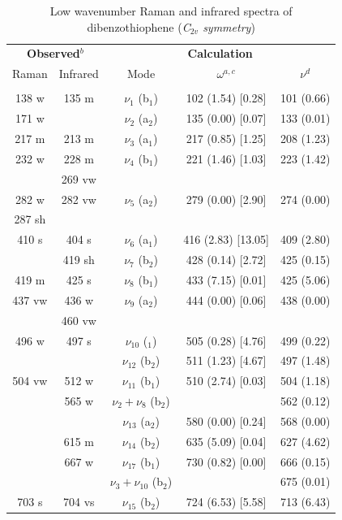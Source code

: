 	\begin{table}[H]
		\begin{center}
			\caption[Low wavenumber Raman and infrared spectra of dibenzothiophene]{Low wavenumber Raman and infrared spectra of dibenzothiophene (\textit{C$_{2v}$ symmetry})}
			\begin{threeparttable}[b]
				\begin{tabular}{c c c c c}
					\toprule
					\multicolumn{2}{p{5cm}}{\centering \textbf{Observed$^{b}$}} & \multicolumn{3}{p{10cm}}{\centering \textbf{Calculation}} \\
					Raman & Infrared & Mode & $\omega^{a,c}$ & $\nu^{d}$ \\
					\midrule
					&  &   &    &   \\
					138 w & 135 m & $\nu_{1}$ (b$_{1}$) & 102 (1.54) [0.28] & 101 (0.66) \\
					171 w &  & $\nu_{2}$ (a$_{2}$) & 135 (0.00) [0.07] & 133 (0.01)\\
					217 m & 213 m & $\nu_{3}$ (a$_{1}$) & 217 (0.85) [1.25] & 208 (1.23) \\
					232 w & 228 m & $\nu_{4}$ (b$_{1}$) & 221 (1.46) [1.03] & 223 (1.42) \\
					& 269 vw &  &  &  \\
					282 w & 282 vw & $\nu_{5}$ (a$_{2}$) & 279 (0.00) [2.90] & 274 (0.00)\\
					287 sh & &  &  & \\
					410 s & 404 s & $\nu_{6}$ (a$_{1}$) & 416 (2.83) [13.05] & 409 (2.80)\\
					& 419 sh & $\nu_{7}$ (b$_{2}$) & 428 (0.14) [2.72] & 425 (0.15) \\
					419 m & 425 s & $\nu_{8}$ (b$_{1}$) & 433 (7.15) [0.01] & 425 (5.06) \\
					437 vw & 436 w & $\nu_{9}$ (a$_{2}$) & 444 (0.00) [0.06] & 438 (0.00) \\
					& 460 vw  &  &   & \\
					496 w & 497 s & $\nu_{10}$ ($_{1}$) & 505 (0.28) [4.76] & 499 (0.22) \\
					&  & $\nu_{12}$ (b$_{2}$) & 511 (1.23) [4.67] & 497 (1.48)\\
					504 vw & 512 w & $\nu_{11}$ (b$_{1}$) & 510 (2.74) [0.03] & 504 (1.18) \\
					& 565 w & $\nu_{2} + \nu_{8}$ (b$_{2}$) &   & 562 (0.12)\\
					&   &   $\nu_{13}$ (a$_{2}$) & 580 (0.00) [0.24] & 568 (0.00) \\
					& 615 m & $\nu_{14}$ (b$_{2}$) & 635 (5.09) [0.04] & 627 (4.62)\\
					& 667 w & $\nu_{17}$ (b$_{1}$) & 730 (0.82) [0.00] & 666 (0.15)\\
					&   &  $\nu_{3} + \nu_{10}$ (b$_{2}$) &  & 675 (0.01)\\
					703 s &704 vs &  $\nu_{15}$ (b$_{2}$) & 724 (6.53) [5.58] & 713 (6.43) \\
					\bottomrule 
				\end{tabular}
				

\end{threeparttable}
\end{center}
\end{table}
